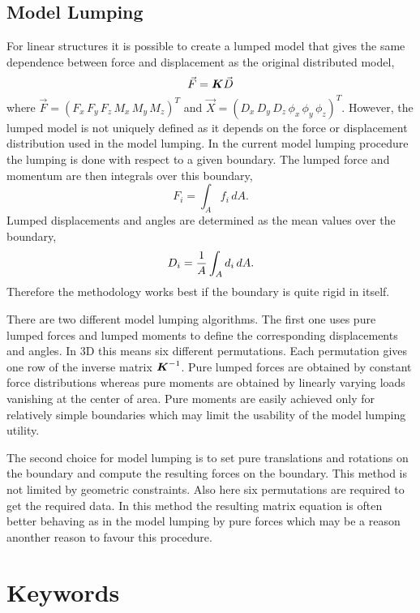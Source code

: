 \begin{versiona}
\subsection{Model Lumping}

For linear structures it is possible to create a lumped model that gives the same
dependence between force and displacement as the original distributed model,
\begin{equation}
  \Vec{F} = {\mbox{\boldmath{${K}$}}} \Vec{D}
\end{equation}
where $\Vec{F}=(F_x\,F_y\,F_z\,M_x\,M_y\,M_z)^T$ and 
$\Vec{X} = (D_x\,D_y\,D_z\,\phi_x\,\phi_y\,\phi_z)^T$. 
However, the lumped model is not uniquely defined as it depends on the force or displacement distribution
used in the model lumping. In the current model lumping procedure the 
lumping is done with respect to a given boundary. 
The lumped force and momentum are
then integrals over this boundary,
\begin{equation}
  F_i = \int_A f_i \, dA .
\end{equation}
Lumped displacements and angles are determined
as the mean values over the boundary, 
\begin{equation}
  D_i = \frac{1}{A} \int_A d_i \, dA.
\end{equation}
Therefore the methodology works best if the 
boundary is quite rigid in itself. 

There are two different model lumping algorithms.
The first one uses 
pure lumped forces and lumped moments to define the corresponding
displacements and angles. In 3D this means six different permutations. 
Each permutation gives one row of the inverse matrix ${\mbox{\boldmath{${K}$}}}^{-1}$.
Pure lumped forces are obtained by constant force distributions whereas
pure moments are obtained by linearly varying loads vanishing at the 
center of area. Pure moments are easily achieved only for relatively simple 
boundaries which may limit the usability of the model lumping utility.

The second choice for model lumping is to set pure translations and rotations
on the boundary and compute the resulting forces on the boundary. This method is not 
limited by geometric constraints. Also here six permutations are required to 
get the required data. In this method the resulting matrix equation is often better 
behaving as in the model lumping by pure forces which may be a reason anonther reason
to favour this procedure. 


\section{Keywords} 
\end{versiona}

